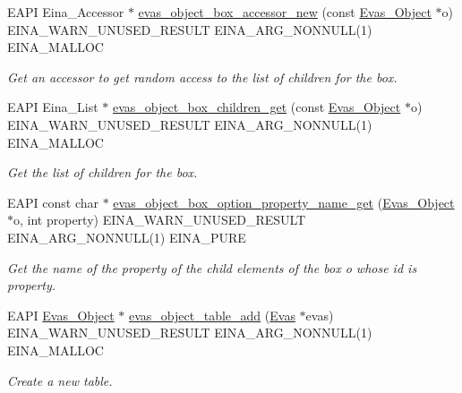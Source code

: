 \begin{DoxyCompactItemize}
EAPI Eina\_\-Accessor $\ast$ \hyperlink{group__Evas__Object__Box_gad5c5837393bd163f6cde72bde073333b}{evas\_\-object\_\-box\_\-accessor\_\-new} (const \hyperlink{group__Evas__Object__Group_ga9e19e6dd1f517a0ba437c0114d3e7c97}{Evas\_\-Object} $\ast$o) EINA\_\-WARN\_\-UNUSED\_\-RESULT EINA\_\-ARG\_\-NONNULL(1) EINA\_\-MALLOC
\begin{DoxyCompactList}\small\item\em Get an accessor to get random access to the list of children for the box. \item\end{DoxyCompactList}\item 
EAPI Eina\_\-List $\ast$ \hyperlink{group__Evas__Object__Box_ga542294a74645829cd5531a8ddec32d9c}{evas\_\-object\_\-box\_\-children\_\-get} (const \hyperlink{group__Evas__Object__Group_ga9e19e6dd1f517a0ba437c0114d3e7c97}{Evas\_\-Object} $\ast$o) EINA\_\-WARN\_\-UNUSED\_\-RESULT EINA\_\-ARG\_\-NONNULL(1) EINA\_\-MALLOC
\begin{DoxyCompactList}\small\item\em Get the list of children for the box. \item\end{DoxyCompactList}\item 
EAPI const char $\ast$ \hyperlink{group__Evas__Object__Box_gad6b908faeca8fb7e16c002509a86ffab}{evas\_\-object\_\-box\_\-option\_\-property\_\-name\_\-get} (\hyperlink{group__Evas__Object__Group_ga9e19e6dd1f517a0ba437c0114d3e7c97}{Evas\_\-Object} $\ast$o, int property) EINA\_\-WARN\_\-UNUSED\_\-RESULT EINA\_\-ARG\_\-NONNULL(1) EINA\_\-PURE
\begin{DoxyCompactList}\small\item\em Get the name of the property of the child elements of the box {\itshape o\/} whose id is {\itshape property\/}. \item\end{DoxyCompactList}\item 
EAPI \hyperlink{group__Evas__Object__Group_ga9e19e6dd1f517a0ba437c0114d3e7c97}{Evas\_\-Object} $\ast$ \hyperlink{group__Evas__Object__Table_gaa8950ef1784409f64fc02345b839768d}{evas\_\-object\_\-table\_\-add} (\hyperlink{group__Evas__Canvas_ga5ff87cc4ce6bc43e3b640a6d37f73043}{Evas} $\ast$evas) EINA\_\-WARN\_\-UNUSED\_\-RESULT EINA\_\-ARG\_\-NONNULL(1) EINA\_\-MALLOC
\begin{DoxyCompactList}\small\item\em Create a new table. \item\end{DoxyCompactList}\item 

\end{DoxyCompactItemize}
